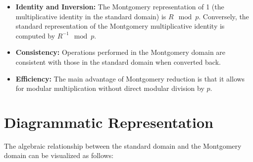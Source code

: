 \begin{itemize}
	\item \textbf{Identity and Inversion:} The Montgomery representation of 1 (the multiplicative identity in the standard domain) is $R \mod p$. Conversely, the standard representation of the Montgomery multiplicative identity is computed by $R^{-1} \mod p$.
	\item \textbf{Consistency:} Operations performed in the Montgomery domain are consistent with those in the standard domain when converted back.
	\item \textbf{Efficiency:} The main advantage of Montgomery reduction is that it allows for modular multiplication without direct modular division by $p$.
\end{itemize}

\section*{Diagrammatic Representation}

The algebraic relationship between the standard domain and the Montgomery domain can be visualized as follows:

\begin{center}
\end{center}

\newpage
